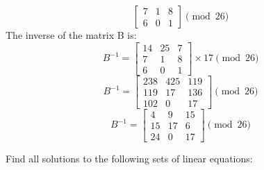 \documentclass[a4paper]{exam}
\begin{document}
\begin{questions}
\begin{solution}
\begin{parts}
\[\begin{bmatrix}
                        7 & 1 & 8\\
                        6 & 0 & 1
                    \end{bmatrix} \pmod{26}
                \]
                The inverse of the matrix B is:
                \[B^{-1} = 
                    \begin{bmatrix}
                        14 & 25 & 7\\
                        7 & 1 & 8\\
                        6 & 0 & 1
                    \end{bmatrix} \times 17 \pmod{26}
                \]
                \[B^{-1} =
                    \begin{bmatrix}
                        238 & 425 & 119\\
                        119 & 17 & 136\\
                        102 & 0 & 17
                    \end{bmatrix} \pmod{26}
                \]
                \[B^{-1} =
                    \begin{bmatrix}
                        4 & 9 & 15\\
                        15 & 17 & 6\\
                        24 & 0 & 17
                    \end{bmatrix} \pmod{26}
                \]
            \end{parts}
        \end{solution}

        \question[10]
        Find all solutions to the following sets of linear equations:
        \begin{solution}
            \begin{parts}

\end{parts}
\end{solution}
\end{questions}
\end{document}
